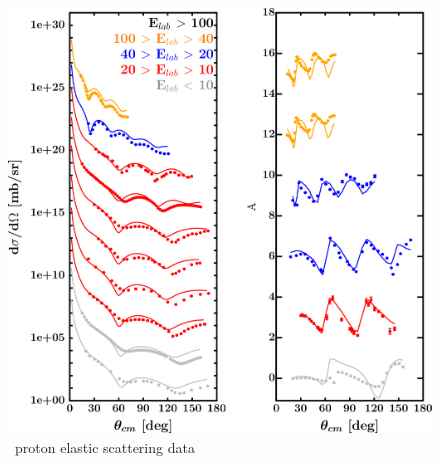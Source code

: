 \label{ni64DOMOutput}
\begin{figure}[H]
    \centering
    \begin{minipage}{0.45\textwidth}
        \centering
        \includegraphics[width=1.0\textwidth]{figures/ni64_protonElastic.png}
        \caption{\niFour\ proton elastic scattering data}
        \label{DOMFitData_ni64_proton_elastic}
    \end{minipage}\hfill
    \begin{minipage}{0.45\textwidth}
        \centering

\end{minipage}
\end{figure}

